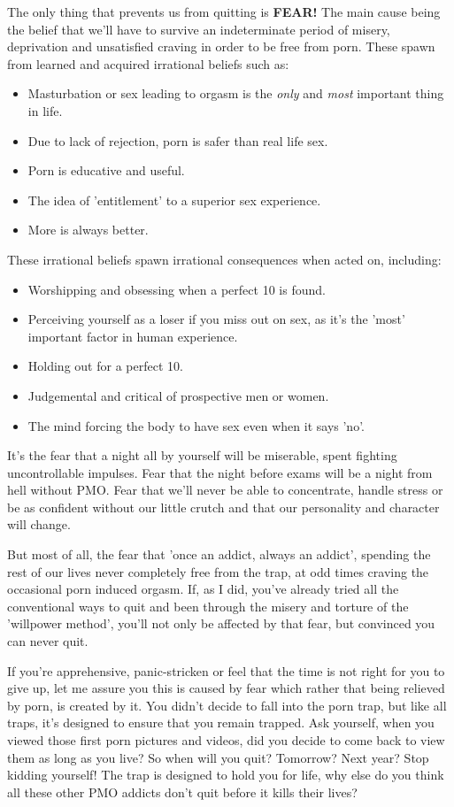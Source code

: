 \documentclass[easypeasy.tex]{subfiles}
\begin{document}
The only thing that prevents us from quitting is \textbf{FEAR!} The main cause being the belief that we'll have to survive an indeterminate period of misery, deprivation and unsatisfied craving in order to be free from porn. These spawn from learned and acquired irrational beliefs such as:
    \begin{itemize}
      \item Masturbation or sex leading to orgasm is the \textit{only} and \textit{most} important thing in life.
      \item Due to lack of rejection, porn is safer than real life sex.
      \item Porn is educative and useful.
      \item The idea of 'entitlement' to a superior sex experience.
      \item More is always better.
    \end{itemize}
These irrational beliefs spawn irrational consequences when acted on, including:
  \begin{itemize}
    \item Worshipping and obsessing when a perfect 10 is found.
    \item Perceiving yourself as a loser if you miss out on sex, as it's the 'most' important factor in human experience.
    \item Holding out for a perfect 10.
    \item Judgemental and critical of prospective men or women.
    \item The mind forcing the body to have sex even when it says 'no'.
  \end{itemize}

It's the fear that a night all by yourself will be miserable, spent fighting uncontrollable impulses. Fear that the night before exams will be a night from hell without PMO. Fear that we'll never be able to concentrate, handle stress or be as confident without our little crutch and that our personality and character will change.

But most of all, the fear that 'once an addict, always an addict', spending the rest of our lives never completely free from the trap, at odd times craving the occasional porn induced orgasm. If, as I did, you've already tried all the conventional ways to quit and been through the misery and torture of the 'willpower method', you'll not only be affected by that fear, but convinced you can never quit.

If you're apprehensive, panic-stricken or feel that the time is not right for you to give up, let me assure you this is caused by fear which rather that being relieved by porn, is created by it. You didn't decide to fall into the porn trap, but like all traps, it's designed to ensure that you remain trapped. Ask yourself, when you viewed those first porn pictures and videos, did you decide to come back to view them as long as you live? So when will you quit? Tomorrow? Next year? Stop kidding yourself! The trap is designed to hold you for life, why else do you think all these other PMO addicts don't quit before it kills their lives?
\end{document}
